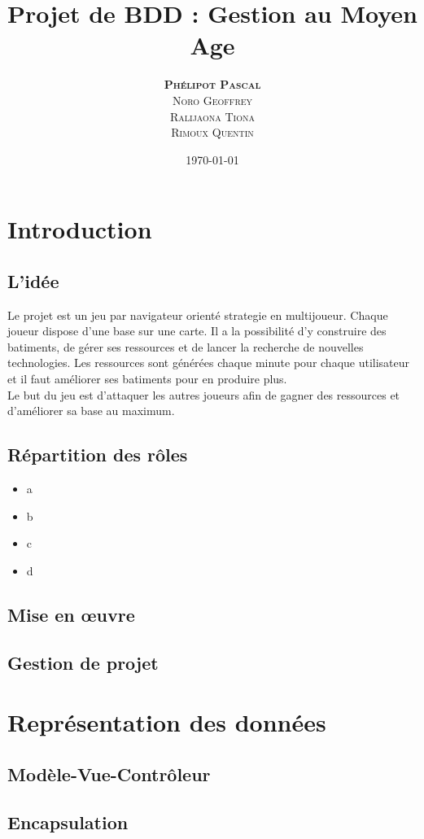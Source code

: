 \documentclass[11pt,a4paper]{article}
\author{\textsc{\textbf{Phélipot Pascal}}\\\textsc{Noro Geoffrey}\\\textsc{Ralijaona Tiona}\\\textsc{Rimoux Quentin}}
\title{Projet de BDD : Gestion au Moyen Age}
\date\today
\begin{document}
\maketitle
\pagestyle{plain}
\newpage{}
\tableofcontents

\newpage{}
\section{Introduction}
\subsection{L'idée}
Le projet est un jeu par navigateur orienté strategie en multijoueur. 
Chaque joueur dispose d'une base sur une carte. Il a la possibilité d'y construire des batiments, de gérer ses ressources et de lancer la recherche de nouvelles technologies.
Les ressources sont générées chaque minute pour chaque utilisateur et il faut améliorer ses batiments pour en produire plus. \\
Le but du jeu est d'attaquer les autres joueurs afin de gagner des ressources et d'améliorer sa base au maximum.


\subsection{Répartition des rôles}
\begin{itemize}
	\item a 
	\item b
	\item c
	\item d
\end{itemize}
\subsection{Mise en œuvre}
\subsection{Gestion de projet}

\newpage\section{Représentation des données}
\subsection{Modèle-Vue-Contrôleur}
\subsection{Encapsulation}
\end{document}

